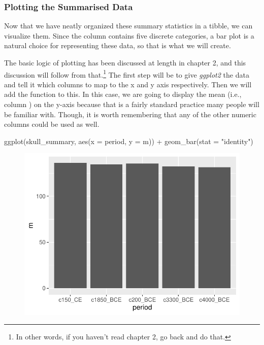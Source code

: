 \subsubsection{Plotting the Summarised Data}

Now that we have neatly organized these summary statistics in a tibble, we can visualize them. Since the  column contains five discrete categories, a bar plot is a natural choice for representing these data, so that is what we will create.

The basic logic of plotting has been discussed at length in chapter 2, and this discussion will follow from that.\footnote{In other words, if you haven't read chapter 2, go back and do that.} The first step will be to give \textit{ggplot2} the data and tell it which columns to map to the x and y axis respectively. Then we will add the  function to this. In this case, we are going to display the mean (i.e., column ) on the y-axis because that is a fairly standard practice many people will be familiar with. Though, it is worth remembering that any of the other numeric columns could be used as well.

\begin{inR}
ggplot(skull_summary, aes(x = period, y = m)) +
  geom_bar(stat = "identity")
\end{inR}

\vspace{2em}

\begin{figure}[H]
\includegraphics[scale = .75]{graphics/ch3Figs/bar_1.pdf}
\end{figure}

